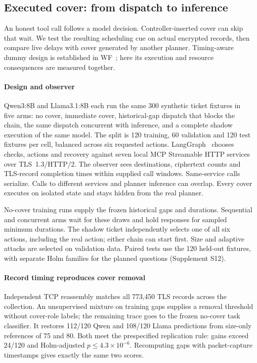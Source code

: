 \subsection{Executed cover: from dispatch to inference}\label{sec:cover-study}
An honest tool call follows a model decision. Controller-inserted cover can skip that wait. We test the resulting scheduling cue on actual encrypted records, then compare live delays with cover generated by another planner. Timing-aware dummy design is established in WF~\cite{shmatikov2006adaptive,juarez2016wtfpad,gong2020front}; here its execution and resource consequences are measured together.

\paragraph{Design and observer}
Qwen3:8B and Llama3.1:8B each run the same 300 synthetic ticket fixtures in five arms: no cover, immediate cover, historical-gap dispatch that blocks the chain, the same dispatch concurrent with inference, and a complete shadow execution of the same model. The split is 120 training, 60 validation and 120 test fixtures per cell, balanced across six requested actions. LangGraph~\cite{langchain2025langgraph} chooses checks, actions and recovery against seven local MCP Streamable HTTP services over TLS~1.3/HTTP/2. The observer sees destinations, ciphertext counts and TLS-record completion times within supplied call windows. Same-service calls serialize. Calls to different services and planner inference can overlap. Every cover executes on isolated state and stays hidden from the real planner.

No-cover training runs supply the frozen historical gaps and durations. Sequential and concurrent arms wait for these draws and hold responses for sampled minimum durations. The shadow ticket independently selects one of all six actions, including the real action; either chain can start first. Size and adaptive attacks are selected on validation data. Paired tests use the 120 held-out fixtures, with separate Holm families for the planned questions (Supplement S12).



\paragraph{Record timing reproduces cover removal}
Independent TCP reassembly matches all 773,450 TLS records across the collection. An unsupervised mixture on training gaps supplies a removal threshold without cover-role labels; the remaining trace goes to the frozen no-cover task classifier. It restores 112/120 Qwen and 108/120 Llama predictions from size-only references of 75 and 80. Both meet the prespecified replication rule: gains exceed 24/120 and Holm-adjusted $p\leq4.3\times10^{-6}$. Recomputing gaps with packet-capture timestamps gives exactly the same two scores.


